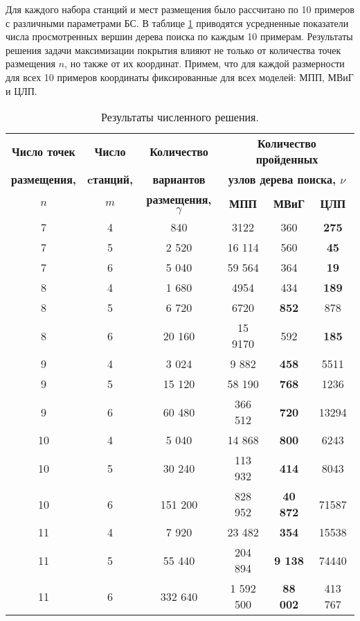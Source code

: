 Для каждого набора станций и мест размещения было рассчитано по 10 примеров с различными параметрами БС. В таблице \cref{tab:models_comparation} приводятся усредненные показатели числа просмотренных вершин дерева поиска по каждым 10 примерам. Результаты решения задачи максимизации покрытия влияют не только от количества точек размещения $n$, но также от их координат. Примем, что для каждой размерности для всех 10 примеров координаты фиксированные для всех моделей: МПП, МВиГ и ЦЛП. 


\begin{table}
  \caption{Результаты численного решения.}\label{tab:models_comparation}
  \begin{tabular}{|ccc|*{3}{c}|} \cline{3-6}
  \hline
  \textbf{Число точек} & \textbf{Число} &\textbf{Количество} & \multicolumn{3}{c|}{\textbf{Количество пройденных}}\\ 
  \textbf{размещения,} & \textbf{cтанций,} & \textbf{вариантов} & \multicolumn{3}{c|}{\textbf{узлов дерева поиска, $\nu$}}\\
  \cline{4-6}
  \textbf{$n$} & \textbf{$m$} &\textbf{размещения, $\gamma$} & \textbf{МПП}& \textbf{МВиГ} & \textbf{ЦЛП} \\ 
  \hline
  7 &  4 & 840 & 3122 & 360 &  \textbf{275} \\
  7 &  5 & 2 520 & 16 114 & 560  &  \textbf{45}  \\
  7 &  6 & 5 040 & 59 564 & 364  &  \textbf{19}  \\
  8 &  4 & 1 680 &  4954 &  434 &   \textbf{189} \\
  8 &  5 & 6 720 & 6720 & \textbf{852}  &  878 \\
  8 &  6 & 20 160 &  15 9170 & 592  & \textbf{185}  \\
  9  &  4 & 3 024 & 9 882 & \textbf{458} & 5511 \\
  9  &  5 & 15 120&  58 190 &  \textbf{768} &  1236\\
  9  &  6 & 60 480&  366 512 &  \textbf{720} & 13294 \\
  10 &  4 & 5 040&  14 868&  \textbf{800}&  6243\\
  10 &	5 & 30 240&  113 932&  \textbf{414}&  8043\\
  10 &	6 & 151 200&  828 952&  \textbf{40 872}&  71587\\
  11 &  4 & 7 920& 23 482&  \textbf{354} & 15538\\
  11 &	5 & 55 440& 204 894& \textbf{9 138}&  74440\\
  11 &	6 & 332 640& 1 592 500 & \textbf{88 002} & 413 767 \\
  \hline
  \end{tabular}
\end{table} 
\normalsize

